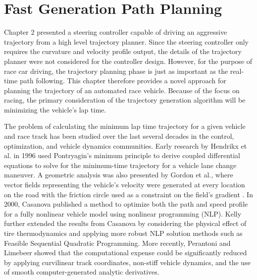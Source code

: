 \chapter{Fast Generation Path Planning}
\label{chapter3}

 Chapter 2 presented a steering controller capable of driving an aggressive trajectory from
 a high level trajectory planner. Since the steering controller only requires the curvature and 
 velocity profile output, the details of the trajectory planner were not considered for the controller design.
 However, for the purpose of race car driving, the trajectory planning phase is just as important as the real-time path following. This
 chapter therefore provides a novel approach for planning the trajectory of an automated race vehicle. Because of the
 focus on racing, the primary consideration of the trajectory generation algorithm will be minimizing the vehicle's lap time.
 
 The problem of calculating the minimum lap time trajectory for a given vehicle and race track has been studied over the last several decades
in the control, optimization, and vehicle dynamics communities.  Early research by Hendrikx et al. \cite{hendrikx} in 1996 used 
 Pontryagin's minimum principle to derive coupled differential equations to solve for the minimum-time trajectory
for a vehicle lane change maneuver. A geometric analysis was also presented by Gordon et al., where vector fields representing the vehicle's velocity
were generated at every location on the road with the friction circle used as a constraint on the field's gradient \cite{gordon}. In 2000, Casanova \cite{casanova} published a method to optimize both the path and speed profile
for a fully nonlinear vehicle model using nonlinear programming (NLP). Kelly \cite{kelly} further extended the results from Casanova by considering
the physical effect of tire thermodynamics and applying more robust NLP solution methods such as Feasible Sequential Quadratic Programming. More recently,
Perantoni and Limebeer \cite{perantoni} showed that the computational expense could be significantly reduced by 
applying curvilinear track coordinates, non-stiff vehicle dynamics, and the use of smooth computer-generated
analytic derivatives. 


